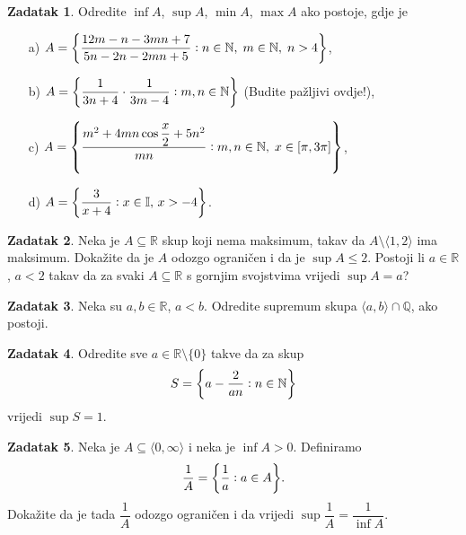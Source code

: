 \documentclass{book}
\let\originalleft\left
\let\originalright\right
\renewcommand{\left}{\mathopen{}\mathclose\bgroup\originalleft}
\renewcommand{\right}{\aftergroup\egroup\originalright}
\theoremstyle{definition}
\theoremstyle{definition}
\newtheorem{exercise}{Zadatak}
\theoremstyle{remark}
\begin{document}
\begin{exercise}
Odredite $\inf{A}$, $\sup{A}$, $\min{A}$, $\max{A}$ ako postoje, gdje je
\begin{itemize}
\item[a)] $A=\left\{\dfrac{12m-n-3mn+7}{5n-2n-2mn+5} : n\in \mathbb{N},\; m\in \mathbb{N},\; n>4\right\}$,
\item[b)] $A=\left\{\dfrac{1}{3n+4}\cdot \dfrac{1}{3m-4} : m, n\in \mathbb{N}\right\}$ (Budite pažljivi ovdje!),
\item[c)] $A=\left\{\dfrac{m^2+4mn\cos{\dfrac{x}{2}}+5n^2}{mn} : m, n\in \mathbb{N},\; x\in [\pi, 3\pi]\right\}$,
\item[d)] $A=\left\{\dfrac{3}{x+4} : x\in \mathbb{I},\, x>-4\right\}$.
\end{itemize}
\end{exercise}
\begin{exercise}
Neka je $A\subseteq \mathbb{R}$ skup koji nema maksimum, takav da $A\setminus\langle 1, 2\rangle$ ima maksimum. Dokažite da je $A$ odozgo ograničen i da je $\sup{A}\leq 2$. Postoji li $a\in \mathbb{R}$, $a<2$ takav da za svaki $A\subseteq \mathbb{R}$ s gornjim svojstvima vrijedi $\sup{A}=a$?
\end{exercise}
\begin{exercise}
Neka su $a, b\in \mathbb{R}$, $a<b$. Odredite supremum skupa $\langle a, b\rangle\cap \mathbb{Q}$, ako postoji.
\end{exercise}
\begin{exercise}
Odredite sve $a\in \mathbb{R}\setminus\{0\}$ takve da za skup
$$S=\left\{a-\dfrac{2}{an} : n\in \mathbb{N}\right\}$$
vrijedi $\sup{S}=1$.
\end{exercise}
\begin{exercise}
Neka je $A\subseteq \langle 0,\infty\rangle$ i neka je $\inf{A}>0$. Definiramo
$$\dfrac{1}{A}=\left\{\dfrac{1}{a} : a\in A\right\}.$$
Dokažite da je tada $\dfrac{1}{A}$ odozgo ograničen i da vrijedi
$\sup{\dfrac{1}{A}}=\dfrac{1}{\inf{A}}$.
\end{exercise}
\end{document}
